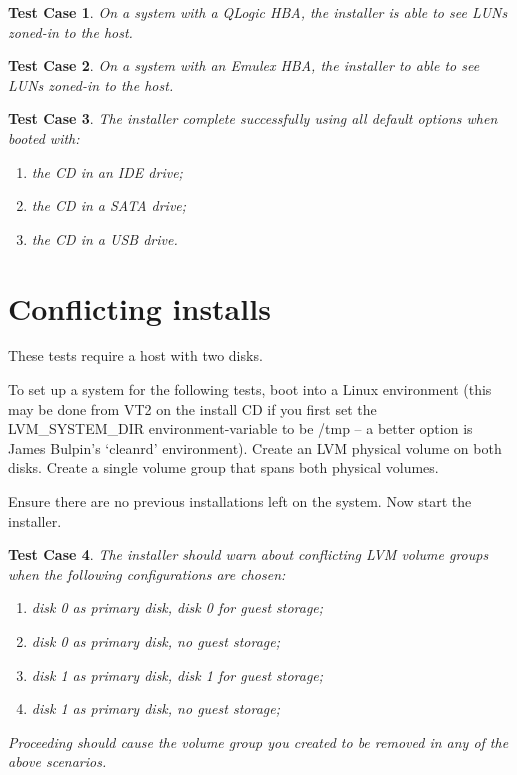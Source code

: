 \documentclass[a4paper]{article}
\newtheorem{testcase}{Test Case}
\begin{document}
\begin{testcase}
On a system with a QLogic HBA, the installer is able to see LUNs
zoned-in to the host.
\end{testcase}

\begin{testcase}
On a system with an Emulex HBA, the installer to able to see LUNs
zoned-in to the host.
\end{testcase}

\begin{testcase}
The installer complete successfully using all default options when
booted with:
\begin{enumerate}
\item the CD in an IDE drive;
\item the CD in a SATA drive;
\item the CD in a USB drive.
\end{enumerate}
\end{testcase}


\section{Conflicting installs}

These tests require a host with two disks.

To set up a system for the following tests, boot into a Linux
environment (this may be done from VT2 on the install CD if you first
set the LVM\_SYSTEM\_DIR environment-variable to be /tmp -- a better
option is James Bulpin's `cleanrd' environment).  Create an LVM
physical volume on both disks. Create a single volume group that spans
both physical volumes.

Ensure there are no previous installations left on the system.  Now
start the installer.

\begin{testcase}
The installer should warn about conflicting LVM volume groups when the
following configurations are chosen:
\begin{enumerate}
\item disk 0 as primary disk, disk 0 for guest storage;
\item disk 0 as primary disk, no guest storage;
\item disk 1 as primary disk, disk 1 for guest storage;
\item disk 1 as primary disk, no guest storage;
\end{enumerate}

Proceeding should cause the volume group you created to be removed in
any of the above scenarios.
\end{testcase}
\end{document}

